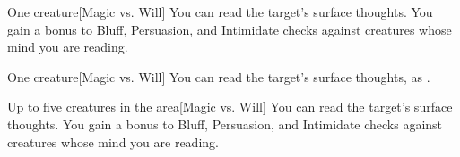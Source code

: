 \begin{spellheader}
    \spellrng{\rngmed}
\end{spellheader}
\begin{spelleffects}
    \begin{spelltarget}{One creature}[Magic vs. Will]
        \spellsuccess You can read the target's surface thoughts. You gain a  bonus to Bluff, Persuasion, and Intimidate checks against creatures whose mind you are reading.
    \end{spelltarget}
\end{spelleffects}
\begin{spellfooter}
    
\end{spellfooter}

\begin{spellheader}
    \spellrng{\rngmed}
\end{spellheader}
\begin{spelleffects}
    \begin{spelltarget}{One creature}[Magic vs. Will]
        \spelleffect You can read the target's surface thoughts, as .
    \end{spelltarget}
\end{spelleffects}
\begin{spellfooter}
    
\end{spellfooter}

\begin{spellheader}
\end{spellheader}
\begin{spelleffects}
    \begin{spelltargets}{Up to five creatures in the area}[Magic vs. Will]
        \spellsuccess You can read the target's surface thoughts. You gain a  bonus to Bluff, Persuasion, and Intimidate checks against creatures whose mind you are reading.
    \end{spelltargets}
\end{spelleffects}
\begin{spellfooter}
    
\end{spellfooter}

